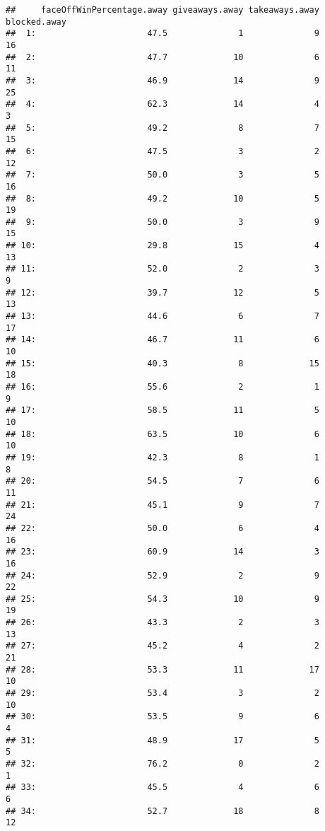 \documentclass[
]{article}
\begin{document}
\begin{verbatim}
##     faceOffWinPercentage.away giveaways.away takeaways.away blocked.away
##  1:                      47.5              1              9           16
##  2:                      47.7             10              6           11
##  3:                      46.9             14              9           25
##  4:                      62.3             14              4            3
##  5:                      49.2              8              7           15
##  6:                      47.5              3              2           12
##  7:                      50.0              3              5           16
##  8:                      49.2             10              5           19
##  9:                      50.0              3              9           15
## 10:                      29.8             15              4           13
## 11:                      52.0              2              3            9
## 12:                      39.7             12              5           13
## 13:                      44.6              6              7           17
## 14:                      46.7             11              6           10
## 15:                      40.3              8             15           18
## 16:                      55.6              2              1            9
## 17:                      58.5             11              5           10
## 18:                      63.5             10              6           10
## 19:                      42.3              8              1            8
## 20:                      54.5              7              6           11
## 21:                      45.1              9              7           24
## 22:                      50.0              6              4           16
## 23:                      60.9             14              3           16
## 24:                      52.9              2              9           22
## 25:                      54.3             10              9           19
## 26:                      43.3              2              3           13
## 27:                      45.2              4              2           21
## 28:                      53.3             11             17           10
## 29:                      53.4              3              2           10
## 30:                      53.5              9              6            4
## 31:                      48.9             17              5            5
## 32:                      76.2              0              2            1
## 33:                      45.5              4              6            6
## 34:                      52.7             18              8           12

\end{verbatim}
\end{document}
